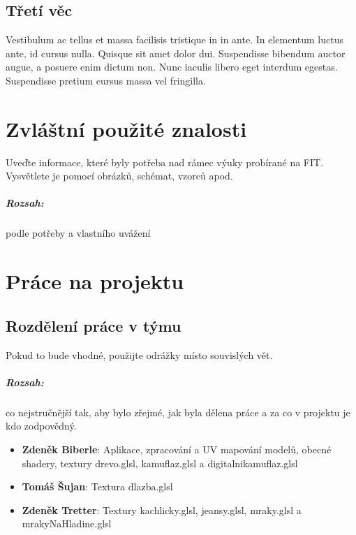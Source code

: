 \documentclass[12pt,a4paper,titlepage,final]{report}
\newcommand\AuthorA{Zdeněk Biberle}
\newcommand\AuthorB{Tomáš Šujan}
\newcommand\AuthorC{Zdeněk Tretter}
\begin{document}
\section{Třetí věc}

Vestibulum ac tellus et massa facilisis tristique in in ante. In elementum luctus ante, id cursus nulla. Quisque sit amet dolor dui. Suspendisse bibendum auctor augue, a posuere enim dictum non. Nunc iaculis libero eget interdum egestas. Suspendisse pretium cursus massa vel fringilla. 
	


\chapter{Zvláštní použité znalosti}

Uveďte informace, které byly potřeba nad rámec výuky probírané na FIT.
Vysvětlete je pomocí obrázků, schémat, vzorců apod. 

\paragraph{Rozsah:} podle potřeby a vlastního uvážení


\chapter{Práce na projektu}

\section{Rozdělení práce v týmu}
Pokud to bude vhodné, použijte odrážky místo souvislých vět.

\paragraph{Rozsah:} co nejstručnější tak, aby bylo zřejmé, jak byla dělena práce a za co v
projektu je kdo zodpovědný.

\begin{itemize}
\item \textbf{\AuthorA}: Aplikace, zpracování a UV mapování modelů, obecné shadery, textury drevo.glsl, kamuflaz.glsl a digitalnikamuflaz.glsl
\item \textbf{\AuthorB}: Textura dlazba.glsl
\item \textbf{\AuthorC}: Textury kachlicky.glsl, jeansy.glsl, mraky.glsl a mrakyNaHladine.glsl
\end{itemize}
\end{document}
